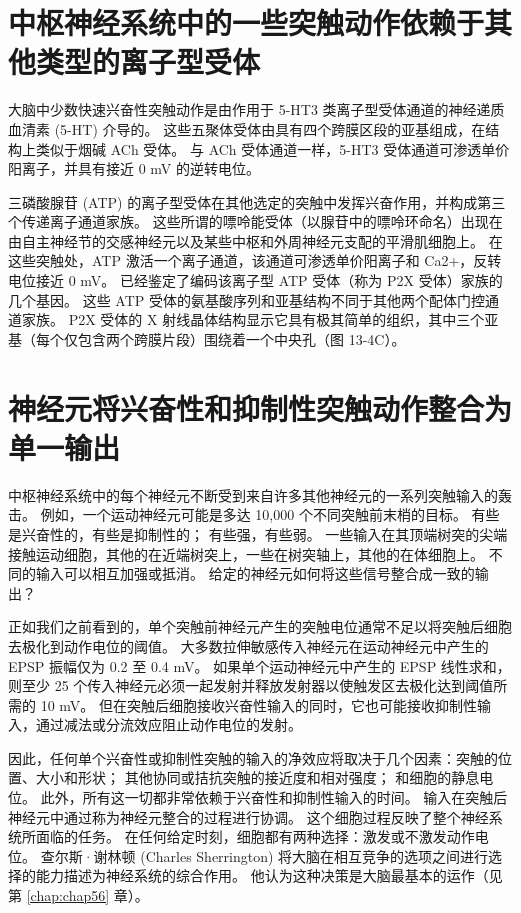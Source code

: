 \section{中枢神经系统中的一些突触动作依赖于其他类型的离子型受体}
大脑中少数快速兴奋性突触动作是由作用于 5-HT3 类离子型受体通道的神经递质血清素 (5-HT) 介导的。 
这些五聚体受体由具有四个跨膜区段的亚基组成，在结构上类似于烟碱 ACh 受体。 
与 ACh 受体通道一样，5-HT3 受体通道可渗透单价阳离子，并具有接近 0 mV 的逆转电位。


三磷酸腺苷 (ATP) 的离子型受体在其他选定的突触中发挥兴奋作用，并构成第三个传递离子通道家族。
这些所谓的嘌呤能受体（以腺苷中的嘌呤环命名）出现在由自主神经节的交感神经元以及某些中枢和外周神经元支配的平滑肌细胞上。
在这些突触处，ATP 激活一个离子通道，该通道可渗透单价阳离子和 Ca2+，反转电位接近 0 mV。
已经鉴定了编码该离子型 ATP 受体（称为 P2X 受体）家族的几个基因。 
这些 ATP 受体的氨基酸序列和亚基结构不同于其他两个配体门控通道家族。 
P2X 受体的 X 射线晶体结构显示它具有极其简单的组织，其中三个亚基（每个仅包含两个跨膜片段）围绕着一个中央孔（图 13-4C）。



\section{神经元将兴奋性和抑制性突触动作整合为单一输出}
中枢神经系统中的每个神经元不断受到来自许多其他神经元的一系列突触输入的轰击。 
例如，一个运动神经元可能是多达 10,000 个不同突触前末梢的目标。 
有些是兴奋性的，有些是抑制性的； 有些强，有些弱。 一些输入在其顶端树突的尖端接触运动细胞，其他的在近端树突上，一些在树突轴上，其他的在体细胞上。 
不同的输入可以相互加强或抵消。 
给定的神经元如何将这些信号整合成一致的输出？


正如我们之前看到的，单个突触前神经元产生的突触电位通常不足以将突触后细胞去极化到动作电位的阈值。 
大多数拉伸敏感传入神经元在运动神经元中产生的 EPSP 振幅仅为 0.2 至 0.4 mV。 
如果单个运动神经元中产生的 EPSP 线性求和，则至少 25 个传入神经元必须一起发射并释放发射器以使触发区去极化达到阈值所需的 10 mV。 
但在突触后细胞接收兴奋性输入的同时，它也可能接收抑制性输入，通过减法或分流效应阻止动作电位的发射。


因此，任何单个兴奋性或抑制性突触的输入的净效应将取决于几个因素：突触的位置、大小和形状； 其他协同或拮抗突触的接近度和相对强度； 和细胞的静息电位。 
此外，所有这一切都非常依赖于兴奋性和抑制性输入的时间。 
输入在突触后神经元中通过称为神经元整合的过程进行协调。 
这个细胞过程反映了整个神经系统所面临的任务。 
在任何给定时刻，细胞都有两种选择：激发或不激发动作电位。
查尔斯·谢林顿 (Charles Sherrington) 将大脑在相互竞争的选项之间进行选择的能力描述为神经系统的综合作用。 
他认为这种决策是大脑最基本的运作（见第 \ref{chap:chap56} 章）。


